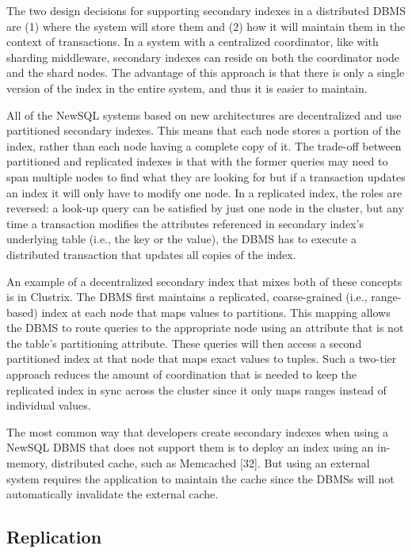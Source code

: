 \documentclass[a4paper,12pt,notitlepage,twoside,openright]{article}
\begin{document}
The two design decisions for supporting secondary indexes in a
distributed DBMS are (1) where the system will store them and (2) how it
will maintain them in the context of transactions. In a system with a
centralized coordinator, like with sharding middleware, secondary
indexes can reside on both the coordinator node and the shard nodes. The
advantage of this approach is that there is only a single version of the
index in the entire system, and thus it is easier to maintain.

All of the NewSQL systems based on new architectures are decentralized
and use partitioned secondary indexes. This means that each node stores
a portion of the index, rather than each node having a complete copy of
it. The trade-off between partitioned and replicated indexes is that
with the former queries may need to span multiple nodes to find what
they are looking for but if a transaction updates an index it will only
have to modify one node. In a replicated index, the roles are reversed:
a look-up query can be satisfied by just one node in the cluster, but
any time a transaction modifies the attributes referenced in secondary
index's underlying table (i.e., the key or the value), the DBMS has to
execute a distributed transaction that updates all copies of the index.

An example of a decentralized secondary index that mixes both of these
concepts is in Clustrix. The DBMS first maintains a replicated,
coarse-grained (i.e., range-based) index at each node that maps values
to partitions. This mapping allows the DBMS to route queries to the
appropriate node using an attribute that is not the table's partitioning
attribute. These queries will then access a second partitioned index at
that node that maps exact values to tuples. Such a two-tier approach
reduces the amount of coordination that is needed to keep the replicated
index in sync across the cluster since it only maps ranges instead of
individual values.

The most common way that developers create secondary indexes when using
a NewSQL DBMS that does not support them is to deploy an index using an
in-memory, distributed cache, such as Memcached {[}32{]}. But using an
external system requires the application to maintain the cache since the
DBMSs will not automatically invalidate the external cache.

\hypertarget{replication}{%
\subsection{Replication}\label{replication}}
\end{document}
